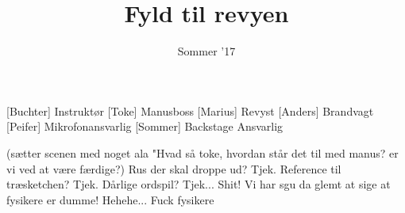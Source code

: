 \documentclass[a4paper,11pt]{article}
\title{Fyld til revyen}
\author{Sommer '17}
\begin{document}
\maketitle

\begin{roles}
[Buchter] Instruktør
[Toke] Manusboss
[Marius] Revyst
[Anders] Brandvagt
[Peifer] Mikrofonansvarlig
[Sommer] Backstage Ansvarlig
\end{roles}

\begin{sketch}

 (sætter scenen med noget ala "Hvad så toke, hvordan står det til med manus? er vi ved at være færdige?)
 Rus der skal droppe ud? Tjek. Reference til træsketchen? Tjek. Dårlige ordspil? Tjek...
 Shit! Vi har sgu da glemt at sige at fysikere er dumme!
 Hehehe... Fuck fysikere

\end{sketch}
\end{document}
